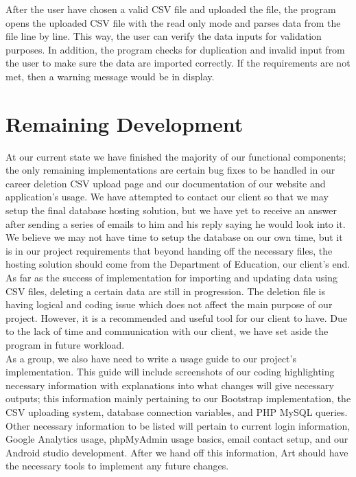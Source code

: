 \documentclass[onecolumn, draftclsnofoot,10pt, compsoc]{IEEEtran}
\begin{document}
\noindent After the user have chosen a valid CSV file and uploaded the file, the program opens the uploaded CSV file with the read only mode and parses data from the file line by line.
This way, the user can verify the data inputs for validation purposes. 
In addition, the program checks for duplication and invalid input from the user to make sure the data are imported correctly.
If the requirements are not met, then a warning message would be in display.\\ 


\section{Remaining Development}

\noindent At our current state we have finished the majority of our functional components; the only remaining implementations are certain bug fixes to be handled in our career deletion CSV upload page and our documentation of our website and application's usage. We have attempted to contact our client so that we may setup the final database hosting solution, but we have yet to receive an answer after sending a series of emails to him and his reply saying he would look into it. We believe we may not have time to setup the database on our own time, but it is in our project requirements that beyond handing off the necessary files, the hosting solution should come from the Department of Education, our client's end.\\

\noindent As far as the success of implementation for importing and updating data using CSV files, deleting a certain data are still in progression. 
The deletion file is having logical and coding issue which does not affect the main purpose of our project. However, it is a recommended and useful tool for our client to have. 
Due to the lack of time and communication with our client, we have set aside the program in future workload.\\ 

\noindent As a group, we also have need to write a usage guide to our project's implementation. This guide will include screenshots of our coding highlighting necessary information with explanations into what changes will give necessary outputs; this information mainly pertaining to our Bootstrap implementation, the CSV uploading system, database connection variables, and PHP MySQL queries. Other necessary information to be listed will pertain to current login information, Google Analytics usage, phpMyAdmin usage basics, email contact setup, and our Android studio development. After we hand off this information, Art should have the necessary tools to implement any future changes.  
\end{document}

